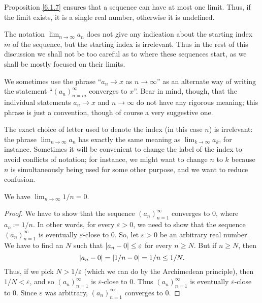 \begin{note}
    Proposition \ref{6.1.7} ensures that a sequence can have at most one limit.
    Thus, if the limit exists, it is a single real number, otherwise it is undefined.
\end{note}

\begin{remark}\label{6.1.9}
    The notation \(\lim_{n \to \infty} a_n\) does not give any indication about the starting index \(m\) of the sequence, but the starting index is irrelevant.
    Thus in the rest of this discussion we shall not be too careful as to where these sequences start, as we shall be mostly focused on their limits.
\end{remark}

\begin{note}
    We sometimes use the phrase ``\(a_n \to x\) as \(n \to \infty\)'' as an alternate way of writing the statement ``\((a_n)_{n = m}^\infty\) converges to \(x\)''.
    Bear in mind, though, that the individual statements \(a_n \to x\) and \(n \to \infty\) do not have any rigorous meaning;
    this phrase is just a convention, though of course a very suggestive one.
\end{note}

\begin{remark}\label{6.1.10}
    The exact choice of letter used to denote the index (in this case \(n\)) is irrelevant:
    the phrase \(\lim_{n \to \infty} a_n\) has exactly the same meaning as \(\lim_{k \to \infty} a_k\), for instance.
    Sometimes it will be convenient to change the label of the index to avoid conflicts of notation;
    for instance, we might want to change \(n\) to \(k\) because \(n\) is simultaneously being used for some other purpose, and we want to reduce confusion.
\end{remark}

\begin{proposition}\label{6.1.11}
    We have \(\lim_{n \to \infty} 1 / n = 0\).
\end{proposition}

\begin{proof}
    We have to show that the sequence \((a_n)_{n = 1}^\infty\) converges to \(0\), where \(a_n \coloneqq 1 / n\).
    In other words, for every \(\varepsilon > 0\), we need to show that the sequence \((a_n)_{n = 1}^\infty\) is eventually \(\varepsilon\)-close to \(0\).
    So, let \(\varepsilon > 0\) be an arbitrary real number.
    We have to find an \(N\) such that \(\abs*{a_n - 0} \leq \varepsilon\) for every \(n \geq N\).
    But if \(n \geq N\), then
    \[
        \abs*{a_n - 0} = \abs*{1 / n - 0} = 1 / n \leq 1 / N.
    \]
    Thus, if we pick \(N > 1 / \varepsilon\) (which we can do by the Archimedean principle), then \(1 / N < \varepsilon\), and so \((a_n)_{n = 1}^\infty\) is \(\varepsilon\)-close to \(0\).
    Thus \((a_n)_{n = 1}^\infty\) is eventually \(\varepsilon\)-close to \(0\).
    Since \(\varepsilon\) was arbitrary, \((a_n)_{n = 1}^\infty\) converges to \(0\).
\end{proof}

